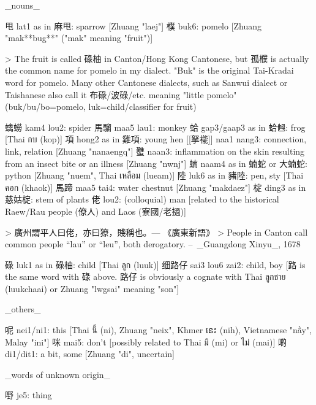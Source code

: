 _nouns_

甩 lat1 as in 麻甩: sparrow [Zhuang "laej"]  
㯷 buk6: pomelo [Zhuang "mak**bug**" ("mak" meaning "fruit")]

> The fruit is called 碌柚 in Canton/Hong Kong Cantonese, but 孤㯷 is actually the common name for pomelo in my dialect. "Buk" is the original Tai-Kradai word for pomelo. Many other Cantonese dialects, such as Sanwui dialect or Taishanese also call it 布碌/波碌/etc. meaning "little pomelo" (buk/bu/bo=pomelo, luk=child/classifier for fruit)

蠄蟧 kam4 lou2: spider  
馬騮 maa5 lau1: monkey  
蛤 gap3/gaap3 as in 蛤乸: frog [Thai กบ (kop)]  
項 hong2 as in 雞項: young hen  
[[拏褦]] naa1 nang3: connection, link, relation [Zhuang "nanaengq"]  
𧕴 naan3: inflammation on the skin resulting from an insect bite or an illness [Zhuang "nwnj"]  
蝻 naam4 as in 蝻蛇 or 大蝻蛇: python [Zhuang "nuem", Thai เหลือม (lueam)]  
陸 luk6 as in 豬陸: pen, sty [Thai คอก (khaok)]  
馬蹄 maa5 tai4: water chestnut [Zhuang "makdaez"]  
椗 ding3 as in 慈姑椗: stem of plants  
佬 lou2: (colloquial) man [related to the historical Raew/Rau people (僚人) and Laos (寮國/老撾)]

> 廣州謂平人曰佬，亦曰獠，賤稱也。— 《廣東新語》  
> People in Canton call common people “lau” or “leu”, both derogatory. -- _Guangdong Xinyu_, 1678

碌 luk1 as in 碌柚: child [Thai ลูก (luuk)]  
细路仔 sai3 lou6 zai2: child, boy [路 is the same word with 碌 above. 路仔 is obviously a cognate with Thai ลูกชาย (luukchaai) or Zhuang "lwgsai" meaning "son"]

_others_

呢 nei1/ni1: this [Thai นี้ (ni), Zhuang "neix", Khmer នេះ (nih), Vietnamese "nầy", Malay "ini"]  
咪 mai5: don't [possibly related to Thai มิ (mi) or ไม่ (mai)]  
啲 di1/dit1: a bit, some [Zhuang "di", uncertain]

_words of unknown origin_

嘢 je5: thing


